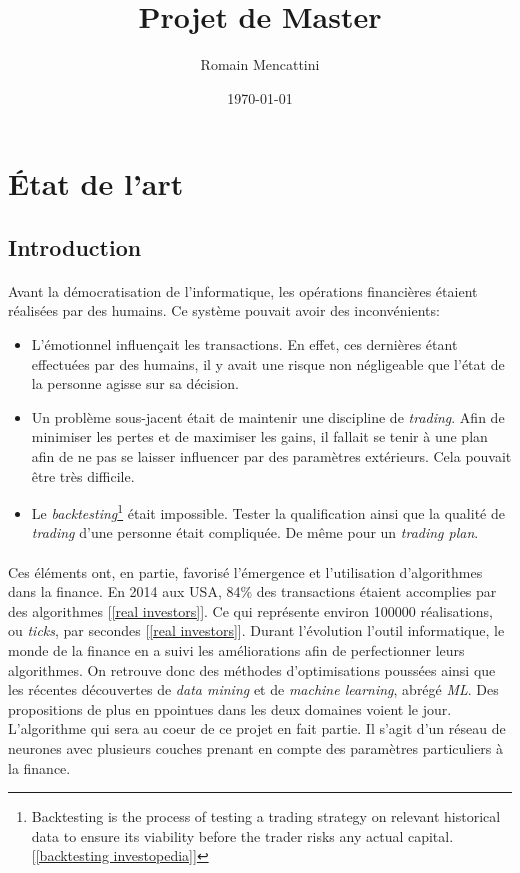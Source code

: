 \documentclass[a4paper, 11pt]{article}
\title{Projet de Master}
\author{Romain Mencattini}
\date{\today}
\begin{document}
\maketitle
\newpage
\tableofcontents
\newpage

\section{État de l'art}
\subsection{Introduction}
\paragraph{}
Avant la démocratisation de l'informatique, les opérations financières étaient réalisées par des humains. Ce système pouvait avoir des inconvénients:
\begin{itemize}
\item L'émotionnel influençait les transactions. En effet, ces dernières étant effectuées par des humains, il y avait une risque non négligeable que l'état de la personne agisse sur sa décision.
\item Un problème sous-jacent était de maintenir une discipline de \textit{trading}. Afin de minimiser les pertes et de maximiser les gains, il fallait se tenir à une plan afin de ne pas se laisser influencer par des paramètres extérieurs. Cela pouvait être très difficile.
\item Le \textit{backtesting}\footnote{Backtesting is the process of testing a trading strategy on relevant historical data to ensure its viability before the trader risks any actual capital. [\ref{backtesting investopedia}]} était impossible. Tester la qualification ainsi que la qualité de \textit{trading} d'une personne était compliquée. De même pour un \textit{trading plan}.
\end{itemize}

\paragraph{}
Ces éléments ont, en partie, favorisé l'émergence et l'utilisation d'algorithmes dans la finance. En 2014 aux USA, 84\% des transactions étaient accomplies par des algorithmes [\ref{real investors}]. Ce qui représente environ 100000 réalisations, ou \textit{ticks}, par secondes [\ref{real investors}].
Durant l'évolution l'outil informatique, le monde de la finance en a suivi les améliorations afin de perfectionner leurs algorithmes.
On retrouve donc des méthodes d'optimisations poussées ainsi que les récentes découvertes de \textit{data mining} et de \textit{machine learning}, abrégé \textit{ML}. Des propositions de plus en ppointues dans les deux domaines voient le jour. L'algorithme qui sera au coeur de ce projet en fait partie. Il s'agit d'un réseau de neurones avec plusieurs couches prenant en compte des paramètres particuliers à la finance.
\end{document}
